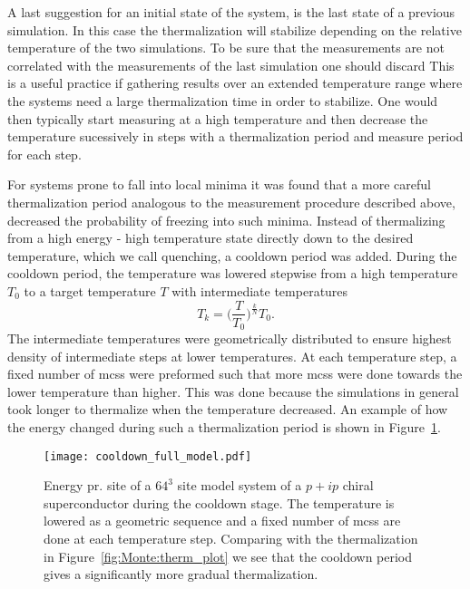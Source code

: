A last suggestion for an initial state of the system,
is the last state of a previous simulation. In this case the thermalization will stabilize depending on the relative temperature
of the two simulations. To be sure that the measurements are not correlated with the measurements of the last simulation one should discard
This is a useful practice if gathering results over an extended temperature range where the systems need a large
thermalization time in order to stabilize. One would then typically start measuring at a high temperature and then decrease the temperature
sucessively in steps with a thermalization period and measure period for each step.

For systems prone to fall into local minima it was found that a more careful thermalization period analogous to the measurement procedure 
described above, decreased the probability of freezing into such minima. Instead of thermalizing from a high energy - high temperature state
directly down to the desired temperature, which we call quenching, a cooldown period was added. During the cooldown period, the temperature was
lowered stepwise from a high temperature $T_0$ to a target temperature $T$ with intermediate temperatures
\begin{equation}
    \label{eq:Monte:Therm:geometricTemperatures}
    T_k = \Big(\frac{T}{T_0}\Big)^{\frac{k}{N}}T_0.
\end{equation}
The intermediate temperatures were geometrically distributed to ensure highest density of intermediate steps at lower temperatures. At
each temperature step, a fixed number of \ac{mcs}s were preformed such that more \ac{mcs}s were done towards the lower temperature than
higher. This was done because the simulations in general took longer to thermalize when the temperature decreased. An example of how the
energy changed during such a thermalization period is shown in Figure~\ref{fig:Monte:cooldown_plot}.

\begin{figure}[t]
    \centering
    \texttt{[image: cooldown\_full\_model.pdf]}
    \caption{Energy pr. site of a $64^3$ site model system of a $p+ip$ chiral superconductor during the cooldown stage. The temperature is
    lowered as a geometric sequence and a fixed number of \ac{mcs}s are done at each temperature step. Comparing with the thermalization
    in Figure~\ref{fig:Monte:therm_plot} we see that the cooldown period gives a significantly more gradual thermalization.}
    \label{fig:Monte:cooldown_plot}
\end{figure}

